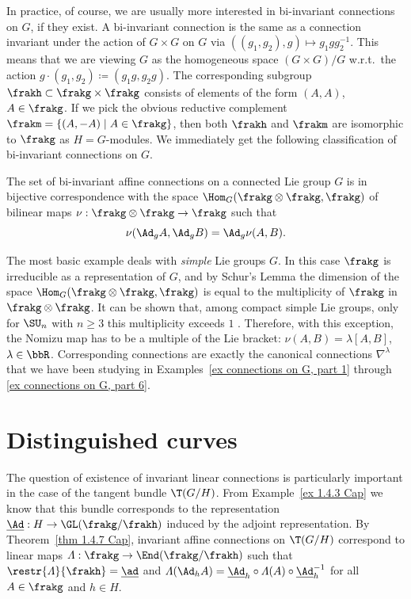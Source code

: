 In practice, of course, we are usually more interested in bi-invariant connections on $G$, if they exist. A bi-invariant connection is the same as a connection invariant under the action of $G\times G$ on $G$ via $((g_1,g_2),g)\mapsto g_1gg_2^{-1}$. This means that we are viewing $G$ as the homogeneous space $(G\times G)\slash G$ w.r.t.\ the action $g\cdot (g_1,g_2)\coloneqq (g_1g,g_2g)$. The corresponding subgroup $\frakh\subset\frakg\times\frakg$ consists of elements of the form $(A,A)$, $A\in\frakg$. If we pick the obvious reductive complement $\frakm=\{(A,-A)\mid A\in\frakg\}$, then both $\frakh$ and $\frakm$ are isomorphic to $\frakg$ as $H=G$-modules. We immediately get the following classification of bi-invariant connections on $G$.

\begin{cor}
    The set of bi-invariant affine connections on a connected Lie group $G$ is in bijective correspondence with the space $\Hom_G(\frakg\otimes\frakg,\frakg)$ of bilinear maps $\nu:\frakg\otimes\frakg\to \frakg$ such that 
    \[\nu(\Ad_g A,\Ad_g B)=\Ad_g \nu(A,B).\]
\end{cor}

The most basic example deals with \emph{simple} Lie groups $G$. In this case $\frakg$ is irreducible as a representation of $G$, and by Schur's Lemma the dimension of the space $\Hom_G(\frakg\otimes\frakg,\frakg)$ is equal to the multiplicity of $\frakg$ in $\frakg\otimes\frakg$. It can be shown that, among compact simple Lie groups, only for $\SU_n$ with $n\geq 3$ this multiplicity exceeds $1$ \cite{Laquer}. Therefore, with this exception, the Nomizu map has to be a multiple of the Lie bracket: $\nu(A,B)=\lambda[A,B]$, $\lambda\in\bbR$. Corresponding connections are exactly the canonical connections $\nabla^\lambda$ that we have been studying in Examples~\ref{ex connections on G, part 1} through \ref{ex connections on G, part 6}.







\section{Distinguished curves}


The question of existence of invariant linear connections is particularly important in the case of the tangent bundle $\T(G\slash H)$. From Example~\ref{ex 1.4.3 Cap} we know that this bundle corresponds to the representation $\underline{\Ad}:H\to \GL(\frakg\slash\frakh)$ induced by the adjoint representation. By Theorem~\ref{thm 1.4.7 Cap}, invariant affine connections on $\T(G\slash H)$ correspond to linear maps $\varLambda:\frakg\to \End(\frakg\slash\frakh)$ such that $\restr{\varLambda}{\frakh}=\underline{\ad}$ and $\varLambda(\Ad_h A)=\underline{\Ad}_h\circ\varLambda(A)\circ \underline{\Ad}_h^{-1}$ for all $A\in\frakg$ and $h\in H$.

